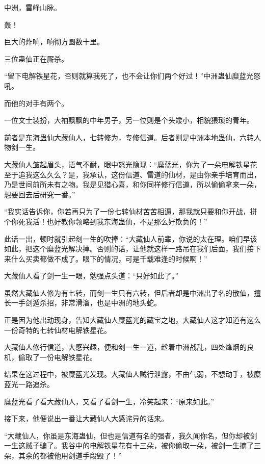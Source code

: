 
\begin{this_body}

中洲，雷峰山脉。

轰！

巨大的炸响，响彻方圆数十里。

三位蛊仙正在厮杀。

“留下电解铁星花，否则就算我死了，也不会让你们两个好过！”中洲蛊仙糜蓝光怒吼。

而他的对手有两个。

一位文士装扮，大袖飘飘的中年男子，另一位则是个头矮小，相貌猥琐的青年。

前者是东海蛊仙大藏仙人，七转修为，专修信道。后者则是中洲本地蛊仙，六转人物剑一生。

大藏仙人皱起眉头，语气不耐，眼中怒光隐现：“糜蓝光，你为了一朵电解铁星花至于追我这么久么？是，我承认，这份信道、雷道的仙材，是由你亲手培育而出，乃是世间前所未有之物。我是见猎心喜，和你同样修行信道，所以偷偷拿来一朵，想要回去后研究一番。”

“我实话告诉你，你若再只为了一份七转仙材苦苦相逼，那我就只要和你开战，拼个你死我活！也好教你领略到我东海蛊仙，不是那么好欺负的！”

此话一出，顿时就引起剑一生的吹捧：“大藏仙人前辈，你说的太在理。咱们早该如此，把这个糜蓝光解决掉。否则的话，让他就这样一路吊在我们后面，我们接下来什么买卖都做不成了。眼下的情况，可是千载难逢的时候啊！”

大藏仙人看了剑一生一眼，勉强点头道：“只好如此了。”

虽然大藏仙人修为有七转，而剑一生只有六转，但后者却是中洲出了名的散仙，擅长一手剑遁杀招，非常滑溜，也是中洲的地头蛇。

正是因为他出动现身，告知大藏仙人糜蓝光的藏宝之地，大藏仙人这才知道有这么一份奇特的七转仙材电解铁星花。

大藏仙人修行信道，大感兴趣，便和剑一生一道，趁着中洲战乱，四处烽烟的良机，偷取了一份电解铁星花。

结果在这过程中，被糜蓝光发现。大藏仙人贼行泄露，不由气弱，不想动手，被糜蓝光一路追杀。

糜蓝光看了看大藏仙人，又看了看剑一生，冷笑起来：“原来如此。”

接下来，他便说出一番让大藏仙人大感诧异的话来。

“大藏仙人，你虽是东海蛊仙，但也是信道有名的强者，我久闻你名，但你却被剑一生这贼子骗了。我谷中的电解铁星花有十三朵，被你偷取一朵，被剑一生摘了三朵，其余的都被他用剑道手段毁了！”


\end{this_body}
